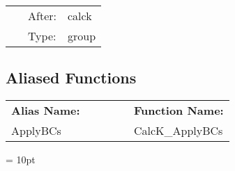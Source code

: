 \hspace{5mm}

 \begin{tabular*}{160mm}{cll} 
~ & After:  & calck \\ 
~ & Type:  & group \\ 
\end{tabular*} 


\subsection*{Aliased Functions}

\hspace{5mm}

 \begin{tabular*}{160mm}{ll} 

{\bf Alias Name:} ~~~~~~~ & {\bf Function Name:} \\ 
ApplyBCs & CalcK\_ApplyBCs \\ 
\end{tabular*} 



\vspace{5mm}\parskip = 10pt 

